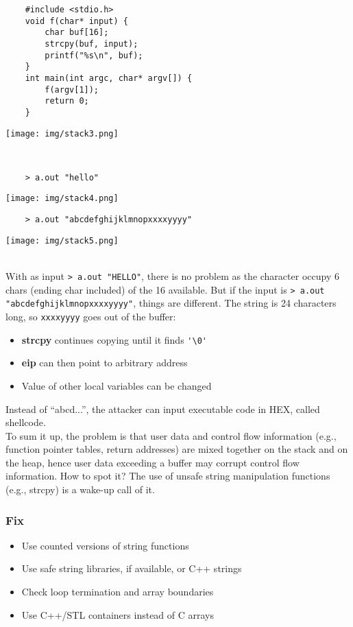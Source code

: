 \documentclass[a4paper, 10pt, titlepage]{article}
\begin{document}
\begin{minipage}{0.6\textwidth}
\begin{lstlisting}
	#include <stdio.h>
	void f(char* input) {
		char buf[16];
		strcpy(buf, input);
		printf("%s\n", buf);
	}
	int main(int argc, char* argv[]) {
		f(argv[1]);
		return 0;
	}
\end{lstlisting}
\end{minipage}
\begin{minipage}{0.3\textwidth}
\texttt{[image: img/stack3.png]}
\end{minipage}\bigskip \\ 
\begin{minipage}{0.45\textwidth}
\begin{verbatim}
	> a.out "hello"
\end{verbatim} \medskip
\texttt{[image: img/stack4.png]}
\end{minipage}
\begin{minipage}{0.45\textwidth}
\begin{verbatim}
	> a.out "abcdefghijklmnopxxxxyyyy"
\end{verbatim} \medskip
\texttt{[image: img/stack5.png]}
\end{minipage} \medskip\\
With as input \lstinline|> a.out "HELLO"|, there is no problem as the character occupy 6 chars (ending char included) of the 16 available. But if the input is \lstinline|> a.out "abcdefghijklmnopxxxxyyyy"|, things are different. The string is 24 characters long, so \lstinline|xxxxyyyy| goes out of the buffer:
\begin{itemize}
\item \textbf{strcpy} continues copying until it finds \lstinline|'\0'|
\item \textbf{eip} can then point to arbitrary address
\item Value of other local variables can be changed
\end{itemize}
Instead of “abcd...”, the attacker can input executable code in HEX, called shellcode. \medskip\\
To sum it up, the problem is that user data and control flow information (e.g., function pointer tables, return addresses) are mixed together on the stack and on the heap, hence user data exceeding a buffer may corrupt control flow information. How to spot it? The use of unsafe string manipulation functions (e.g., strcpy) is a wake-up call of it. 

\subsubsection*{Fix}
\begin{itemize}
\item Use counted versions of string functions
\item Use safe string libraries, if available, or C++ strings
\item Check loop termination and array boundaries
\item Use C++/STL containers instead of C arrays
\end{itemize}
\end{document}
